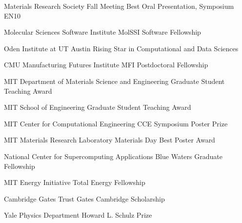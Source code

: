 {Materials Research Society Fall Meeting}
{Best Oral Presentation, Symposium EN10}{}

{Molecular Sciences Software Institute}
{MolSSI Software Fellowship}{}

\datedsubsectionnarrow{}
{Oden Institute at UT Austin}
{Rising Star in Computational and Data Sciences}{}

{CMU Manufacturing Futures Institute}
{MFI Postdoctoral Fellowship}{}

\datedsubsectionnarrow{}
{MIT Department of Materials Science and Engineering}
{Graduate Student Teaching Award}

\datedsubsectionnarrow{}
{MIT School of Engineering}
{Graduate Student Teaching Award}

\datedsubsectionnarrow{}
{MIT Center for Computational Engineering}
{CCE Symposium Poster Prize}{}

{MIT Materials Research Laboratory}
{Materials Day Best Poster Award}{}

{National Center for Supercomputing Applications}
{Blue Waters Graduate Fellowship}{}

{MIT Energy Initiative}
{Total Energy Fellowship}{}

{Cambridge Gates Trust}
{Gates Cambridge Scholarship}{}

\datedsubsectionnarrow{}
{Yale Physics Department}
{Howard L. Schulz Prize}{}
